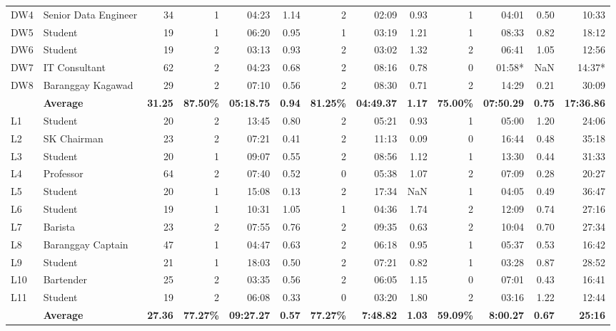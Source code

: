 \documentclass{sigchi}
\begin{document}
\begin{table}[t]
{\begin{tabular}{llrrrrrrrrrrr}
DW4 & Senior Data Engineer & 34 & 1 & 04:23 & 1.14 & 2 & 02:09 & 0.93 & 1 & 04:01 & 0.50 & 10:33 \\
DW5 & Student & 19 & 1 & 06:20 & 0.95 & 1 & 03:19 & 1.21 & 1 & 08:33 & 0.82 & 18:12 \\
DW6 & Student & 19 & 2 & 03:13 & 0.93 & 2 & 03:02 & 1.32 & 2 & 06:41 & 1.05 & 12:56 \\
DW7 & IT Consultant & 62 & 2 & 04:23 & 0.68 & 2 & 08:16 & 0.78 & 0 & 01:58* & NaN & 14:37* \\
DW8 & Baranggay Kagawad & 29 & 2 & 07:10 & 0.56 & 2 & 08:30 & 0.71 & 2 & 14:29 & 0.21 & 30:09 \\
 & \textbf{Average} & \textbf{31.25} & \textbf{87.50\%} & \textbf{05:18.75} & \textbf{0.94} & \textbf{81.25\%} & \textbf{04:49.37} & \textbf{1.17} & \textbf{75.00\%} & \textbf{07:50.29} & \textbf{0.75} & \textbf{17:36.86} \\ \midrule
L1 & Student & 20 & 2 & 13:45 & 0.80 & 2 & 05:21 & 0.93 & 1 & 05:00 & 1.20 & 24:06 \\
L2 & SK Chairman & 23 & 2 & 07:21 & 0.41 & 2 & 11:13 & 0.09 & 0 & 16:44 & 0.48 & 35:18 \\
L3 & Student & 20 & 1 & 09:07 & 0.55 & 2 & 08:56 & 1.12 & 1 & 13:30 & 0.44 & 31:33 \\
L4 & Professor & 64 & 2 & 07:40 & 0.52 & 0 & 05:38 & 1.07 & 2 & 07:09 & 0.28 & 20:27 \\
L5 & Student & 20 & 1 & 15:08 & 0.13 & 2 & 17:34 & NaN & 1 & 04:05 & 0.49 & 36:47 \\
L6 & Student & 19 & 1 & 10:31 & 1.05 & 1 & 04:36 & 1.74 & 2 & 12:09 & 0.74 & 27:16 \\
L7 & Barista & 23 & 2 & 07:55 & 0.76 & 2 & 09:35 & 0.63 & 2 & 10:04 & 0.70 & 27:34 \\
L8 & Baranggay Captain & 47 & 1 & 04:47 & 0.63 & 2 & 06:18 & 0.95 & 1 & 05:37 & 0.53 & 16:42 \\
L9 & Student & 21 & 1 & 18:03 & 0.50 & 2 & 07:21 & 0.82 & 1 & 03:28 & 0.87 & 28:52 \\
L10 & Bartender & 25 & 2 & 03:35 & 0.56 & 2 & 06:05 & 1.15 & 0 & 07:01 & 0.43 & 16:41 \\
L11 & Student & 19 & 2 & 06:08 & 0.33 & 0 & 03:20 & 1.80 & 2 & 03:16 & 1.22 & 12:44 \\
 & \textbf{Average} & \textbf{27.36} & \textbf{77.27\%} & \textbf{09:27.27} & \textbf{0.57} & \textbf{77.27\%} & \textbf{7:48.82} & \textbf{1.03} & \textbf{59.09\%} & \textbf{8:00.27} & \textbf{0.67} & \textbf{25:16} \\ 

\end{tabular}}
\end{table}
\end{document}
